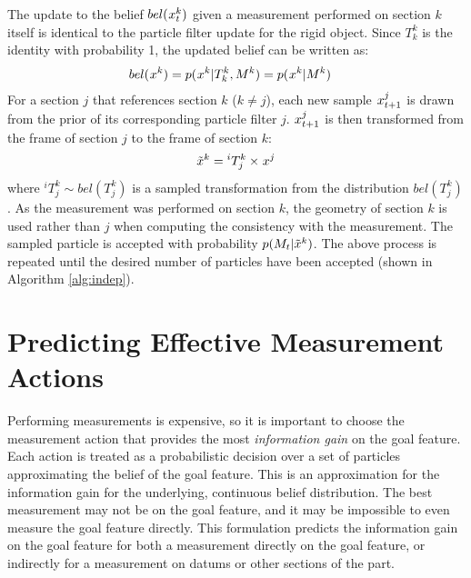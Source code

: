 \documentclass[../thesis.tex]{subfiles}
\begin{document}
The update to the belief $bel(\particle[t][][k])$ given a measurement performed on section $k$ itself is identical to the particle filter update for the rigid object. 
Since $T^k_k$ is the identity with probability 1, the updated belief can be written as:
\begin{align}
bel(\particle[][][k]) &= p(\particle[][][k]|T^k_k,M^k) =p(\particle[][][k]|M^k)
\end{align}
For a section $j$ that references section $k$ ($k \neq j$), each new sample $\particle[t+1][][j]$ is drawn from the prior of its corresponding particle filter $j$. 
$\particle[t+1][][j]$ is then transformed from the frame of section $j$ to the frame of section $k$: 
\begin{align}
\sampled{x}^k = {^iT^k_j} \times \particle[][][j]
\end{align}
where $ ^iT^k_j \sim bel(T^k_j)$ is a sampled transformation from the distribution $bel(T^k_j)$.
As the measurement was performed on section $k$, the geometry of section $k$ is used rather than $j$ when computing the consistency with the measurement. 
The sampled particle is accepted with probability $p(M_t|\tilde{x}^k)$. 
The above process is repeated until the desired number of particles have been accepted (shown in Algorithm \ref{alg:indep}).




\section{Predicting Effective Measurement Actions} \label{sec:information gain}
Performing measurements is expensive, so it is important to choose the measurement action that provides the most \textit{information gain} on the goal feature. 
Each action is treated as a probabilistic decision over a set of particles approximating the belief of the goal feature.
This is an approximation for the information gain for the underlying, continuous belief distribution.
The best measurement may not be on the goal feature, and it may be impossible to even measure the goal feature directly.
This formulation predicts the information gain on the goal feature for both a measurement directly on the goal feature, or indirectly for a measurement on datums or other sections of the part.
\end{document}
